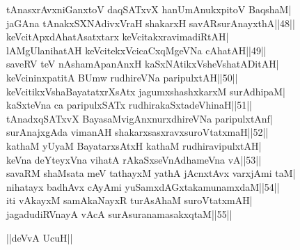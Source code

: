 \documentclass{article}
\begin{document}
tAnasxrAvxniGanxtoV daqSATxvX hanUmAnukxpitoV BaqshaM|\\
jaGAna tAnakxSXNAdivxVraH shakarxH savARsurAnayxthA||48||\\
keVcitApxdAhatAsatxtarx keVcitakxravimadiRtAH|\\
lAMgUlanihatAH keVcitekxVcicaCxqMgeVNa cAhatAH||49||\\
saveRV teV nAshamApanAnxH kaSxNAtikxVsheVshatADitAH|\\
keVcininxpatitA BUmw rudhireVNa paripulxtAH||50||\\
keVcitikxVshaBayatatxrXsAtx jagumxshashxkarxM surAdhipaM|\\
kaSxteVna ca paripulxSATx rudhirakaSxtadeVhinaH||51||\\
tAnadxqSATxvX BayasaMvigAnxnurxdhireVNa paripulxtAnf|\\
surAnajxgAda vimanAH shakarxsasxravxsuroVtatxmaH||52||\\
kathaM yUyaM BayatarxsAtxH kathaM rudhiravipulxtAH|\\
keVna deYteyxVna vihatA rAkaSxseVnAdhameVna vA||53||\\
savaRM shaMsata meV tathayxM yathA jAcnxtAvx varxjAmi taM|\\
nihatayx badhAvx cAyAmi yuSamxdAGxtakamunamxdaM||54||\\
iti vAkayxM samAkaNayxR turAsAhaM suroVtatxmAH|\\
jagadudiRVnayA vAcA surAsuranamasakxqtaM||55||\\

\begin{center}
||deVvA UcuH||
\end{center}
\end{document}
